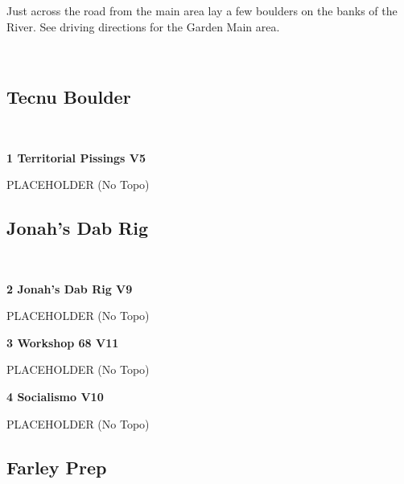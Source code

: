 \begin{multicols}{2}
Just across the road from the main area lay a few boulders on the banks of the River. See driving directions for the Garden Main area.

	\
			\subsection*{Tecnu Boulder}\label{bf:Tecnu Boulder}
			\
			
					\label{rt:Territorial Pissings} \colorbox{RoyalBlue!20}{\textbf{1 Territorial Pissings V5  }}
					\begin{adjustwidth}{1cm}{}
					PLACEHOLDER
						\newline (No Topo) 
					\end{adjustwidth}
			\subsection*{Jonah's Dab Rig}\label{bf:Jonah's Dab Rig}
			\
			
					\label{rt:Jonah's Dab Rig} \colorbox{Goldenrod!50}{\textbf{2 Jonah's Dab Rig V9  }}
					\begin{adjustwidth}{1cm}{}
					PLACEHOLDER
						\newline (No Topo) 
					\end{adjustwidth}
					\label{rt:Workshop 68} \colorbox{red!20}{\textbf{3 Workshop 68 V11  }}
					\begin{adjustwidth}{1cm}{}
					PLACEHOLDER
						\newline (No Topo) 
					\end{adjustwidth}
					\label{rt:Socialismo} \colorbox{red!20}{\textbf{4 Socialismo V10  }}
					\begin{adjustwidth}{1cm}{}
					PLACEHOLDER
						\newline (No Topo) 
					\end{adjustwidth}
			\subsection*{Farley Prep}\label{bf:Farley Prep}
			\
			

\end{multicols}
